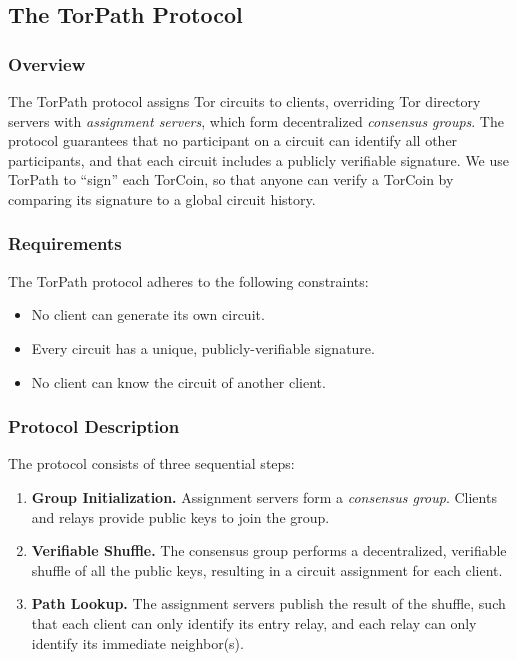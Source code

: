 \subsection{The TorPath Protocol}

\subsubsection{Overview}
The TorPath protocol assigns Tor circuits to clients, overriding Tor
directory servers with \textit{assignment servers}, which form decentralized
\textit{consensus groups}. The protocol guarantees that no participant on a 
circuit can identify all other participants, and that each circuit includes a 
publicly verifiable signature. We use TorPath to ``sign'' each TorCoin, so that 
anyone can verify a TorCoin by comparing its signature to a global circuit
history.

\subsubsection{Requirements}
The TorPath protocol adheres to the following constraints:

\begin{itemize}   
\item No client can generate its own circuit.
\item Every circuit has a unique, publicly-verifiable signature.
\item No client can know the circuit of another client.
\end{itemize}

\subsubsection{Protocol Description}

The protocol consists of three sequential steps:

\begin{enumerate}
\item \textbf{Group Initialization.} Assignment servers form a \textit{consensus 
group}. Clients and relays provide public keys to join the group.

\item \textbf{Verifiable Shuffle.} The consensus group performs a decentralized, 
verifiable shuffle of all the public keys, resulting in a circuit assignment for
each client.

\item \textbf{Path Lookup.} The assignment servers publish the result of the 
shuffle, such that each client can only identify its entry relay, and each 
relay can only identify its immediate neighbor(s). 
\end{enumerate}

